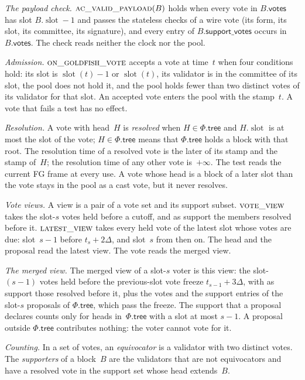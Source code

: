 \documentclass{article}
\newcommand{\slot}{\operatorname{slot}}
\newcommand{\Fr}{\Phi}
\newcommand{\tree}{\mathsf{tree}}
\begin{document}
\emph{The payload check.}  $\Call{ac\_valid\_payload}{B}$ holds when every
vote in $B.\mathsf{votes}$ has slot $B.\slot-1$ and passes the stateless
checks of a wire vote (its form, its slot, its committee, its signature),
and every entry of $B.\mathsf{support\_votes}$ occurs in
$B.\mathsf{votes}$.  The check reads neither the clock nor the pool.

\emph{Admission.}  $\Call{on\_goldfish\_vote}{}$ accepts a vote at time~$t$
when four conditions hold: its slot is $\slot(t)-1$ or $\slot(t)$, its
validator is in the committee of its slot, the pool does not hold it, and
the pool holds fewer than two distinct votes of its validator for that
slot.  An accepted vote enters the pool with the stamp~$t$.  A vote that
fails a test has no effect.

\emph{Resolution.}  A vote with head~$H$ is \emph{resolved} when
$H\in\Fr.\tree$ and $H.\slot$ is at most the slot of the vote;
$H\in\Fr.\tree$ means that $\Fr.\tree$ holds a block with that root.  The
resolution time of a resolved vote is the later of its stamp and the stamp
of~$H$; the resolution time of any other vote is~$+\infty$.  The test reads
the current FG frame at every use.  A vote whose head is a block of a later
slot than the vote stays in the pool as a cast vote, but it never resolves.

\emph{Vote views.}  A view is a pair of a vote set and its support subset.
$\Call{vote\_view}{}$ takes the slot-$s$ votes held before a cutoff, and as
support the members resolved before it.  $\Call{latest\_view}{}$ takes every
held vote of the latest slot whose votes are due: slot~$s-1$ before
$t_s+2\Delta$, and slot~$s$ from then on.  The head and the proposal read
the latest view.  The vote reads the merged view.

\emph{The merged view.}  The merged view of a slot-$s$ voter is this view:
the slot-$(s-1)$ votes held before the previous-slot vote freeze
$t_{s-1}+3\Delta$, with as support those resolved before it, plus the votes
and the support entries of the slot-$s$ proposals of $\Fr.\tree$, which
pass the freeze.  The support that a proposal declares counts only for
heads in~$\Fr.\tree$ with a slot at most $s-1$.  A proposal outside
$\Fr.\tree$ contributes nothing: the voter cannot vote for it.

\emph{Counting.}  In a set of votes, an \emph{equivocator} is a validator
with two distinct votes.  The \emph{supporters} of a block~$B$ are the
validators that are not equivocators and have a resolved vote in the
support set whose head extends~$B$.
\end{document}
